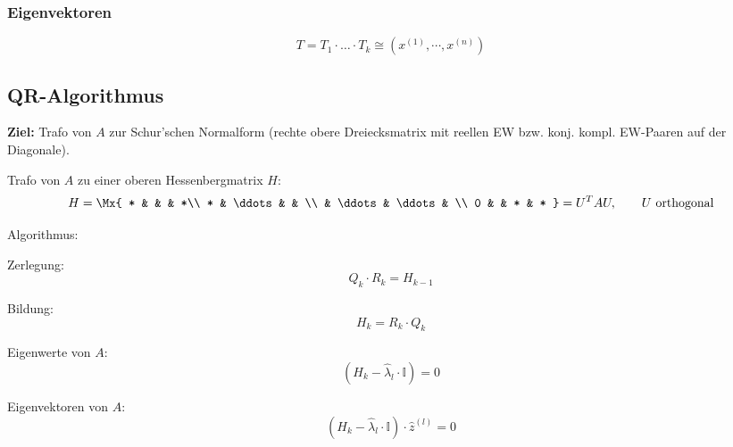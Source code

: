 		\subsubsection{Eigenvektoren}
			\[
				T= T_1 \cdot \dots \cdot T_k \cong (x^{(1)}, \cdots , x^{(n)})
			\]

	\subsection{QR-Algorithmus}
		\textbf{Ziel:} Trafo von $A$ zur Schur'schen Normalform (rechte obere Dreiecksmatrix mit reellen EW bzw. konj. kompl. EW-Paaren auf der Diagonale).

		\begin{tightenumerate}
			\item Trafo von $A$ zu einer oberen Hessenbergmatrix $H$:
				\[
					H = \Mx{
						* & & & *\\
						* & \ddots & & \\
						& \ddots & \ddots & \\
						0 & & * & *
					} = U^TAU,\qquad U \text{ orthogonal}
				\]
			\item Algorithmus:
				\begin{tightenumerate}
					\item Zerlegung:
						\[
							Q_k \cdot R_k = H_{k-1}
						\]
					\item Bildung:
						\[
							H_k = R_k \cdot Q_k
						\]
				\end{tightenumerate}
			\item Eigenwerte von $A$:
				\[
					(H_k - \hat \lambda_l \cdot \mathbb{I})= 0
				\]
			\item Eigenvektoren von $A$:
				\[
					(H_k - \hat \lambda_l \cdot \mathbb{I})\cdot \hat z ^{(l)}= 0
				\]
		\end{tightenumerate}

